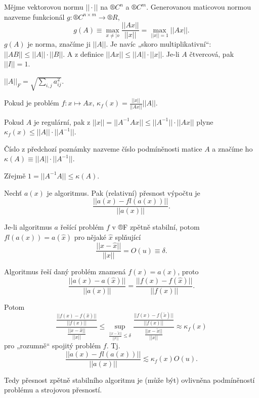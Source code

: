 \documentclass[12pt]{article}					%
\begin{document}
	\begin{definice}
		Mějme vektorovou normu $||·||$ na $®C^n$ a $®C^m$. Generovanou maticovou normou nazveme funkcionál $g: ®C^{n \times m} \rightarrow ®R$,
		$$ g(A) ≡ \max_{x ≠ ¦o} \frac{||Ax||}{||x||} = \max_{||x|| = 1} ||Ax||. $$
		$g(A)$ je norma, značíme ji $||A||$. Je navíc „skoro multiplikativní“: $||AB|| ≤ ||A||·||B||$. A z definice $||Ax|| ≤ ||A||·||x||$. Je-li $A$ čtvercová, pak $||I|| = 1$.
	\end{definice}

	\begin{definice}
		$||A||_F = \sqrt{\sum_{i, j} a_{ij}^2}$.
	\end{definice}

	\begin{poznamka}[Podmíněnost $Ax$]
		Pokud je problém $f: x \mapsto Ax$, $\kappa_f(x) = \frac{||x||}{||Ax||}||A||$.

		Pokud $A$ je regulární, pak z $||x|| = ||A^{-1}Ax|| ≤ ||A^{-1}||·||Ax||$ plyne $\kappa_f(x) ≤ ||A||·||A^{-1}||$.
	\end{poznamka}

	\begin{definice}
		Číslo z předchozí poznámky nazveme číslo podmíněnosti matice $A$ a značíme ho $\kappa(A) ≡ ||A||·||A^{-1}||$.

		\begin{poznamkain}
			Zřejmě $1 = ||A^{-1}A|| ≤ \kappa(A)$.
		\end{poznamkain}
	\end{definice}

	\begin{definice}
		Nechť $a(x)$ je algoritmus. Pak (relativní) přesnost výpočtu je
		$$ \frac{||a(x) - fl(a(x))||}{||a(x)||}. $$
	\end{definice}

	\begin{poznamka}
		Je-li algoritmus $a$ řešící problém $f$ v ®F zpětně stabilní, potom $fl(a(x)) = a(\hat{x})$ pro nějaké $\hat{x}$ splňující
		$$ \frac{||x - \hat{x}||}{||x||} = O(u) ≡ \delta. $$

		Algoritmus řeší daný problém znamená $f(x) = a(x)$, proto
		$$ \frac{||a(x) - a(\hat{x})||}{||a(x)||} = \frac{||f(x) - f(\hat{x})||}{||f(x)||}. $$

		Potom
		$$ \frac{\frac{||f(x) - f(\hat{x})||}{||f(x)||}}{\frac{||x - \hat{x}||}{||x||}} ≤ \sup_{\frac{||x - \tilde x||}{||x||} ≤ \delta} \frac{\frac{||f(x) - f(\tilde{x})||}{||f(x)||}}{\frac{||x - \tilde{x}||}{||x||}} \approx \kappa_f(x) $$
		pro „rozumně“ spojitý problém $f$. Tj.
		$$ \frac{||a(x) - fl(a(x))||}{||a(x)||} \lesssim \kappa_f(x) O(u). $$

		Tedy přesnost zpětně stabilního algoritmu je (může být) ovlivněna podmíněností problému a strojovou přesností.
	\end{poznamka}
\end{document}
